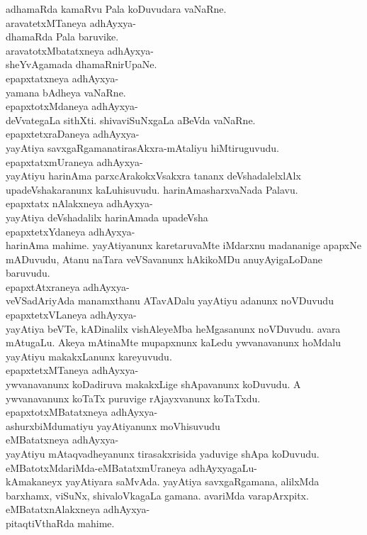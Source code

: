 \documentclass{article}
\begin{document}
adhamaRda kamaRvu Pala koDuvudara vaNaRne.\\
aravatetxMTaneya adhAyxya-\\
dhamaRda Pala baruvike.\\
aravatotxMbatatxneya adhAyxya-\\
sheYvAgamada dhamaRnirUpaNe.\\
epapxtatxneya adhAyxya-\\
yamana bAdheya vaNaRne.\\
epapxtotxMdaneya adhAyxya-\\
deVvategaLa sithXti. shivaviSuNxgaLa aBeVda vaNaRne.\\
epapxtetxraDaneya adhAyxya-\\
yayAtiya savxgaRgamanatirasAkxra-mAtaliyu hiMtiruguvudu.\\
epapxtatxmUraneya adhAyxya-\\
yayAtiyu harinAma parxcArakokxVsakxra tananx deVshadalelxlAlx upadeVshakaranunx kaLuhisuvudu. harinAmasharxvaNada Palavu.\\
epapxtatx nAlakxneya adhAyxya-\\
yayAtiya deVshadalilx harinAmada upadeVsha\\
epapxtetxYdaneya adhAyxya-\\
harinAma mahime. yayAtiyanunx karetaruvaMte iMdarxnu madananige apapxNe mADuvudu, Atanu naTara veVSavanunx hAkikoMDu anuyAyigaLoDane baruvudu.\\
epapxtAtxraneya adhAyxya-\\
veVSadAriyAda manamxthanu ATavADalu yayAtiyu adanunx noVDuvudu\\
epapxtetxVLaneya adhAyxya-\\
yayAtiya beVTe, kADinalilx vishAleyeMba heMgasanunx noVDuvudu. avara mAtugaLu. Akeya mAtinaMte mupapxnunx kaLedu ywvanavanunx hoMdalu yayAtiyu makakxLanunx kareyuvudu.\\
epapxtetxMTaneya adhAyxya-\\
ywvanavanunx koDadiruva makakxLige shApavanunx koDuvudu. A ywvanavanunx koTaTx puruvige rAjayxvanunx koTaTxdu.\\
epapxtotxMBatatxneya adhAyxya-\\
ashurxbiMdumatiyu yayAtiyanunx moVhisuvudu\\
eMBatatxneya adhAyxya-\\
yayAtiyu mAtaqvadheyanunx tirasakxrisida yaduvige shApa koDuvudu.\\
eMBatotxMdariMda-eMBatatxmUraneya adhAyxyagaLu-\\
kAmakaneyx yayAtiyara saMvAda. yayAtiya savxgaRgamana, alilxMda barxhamx, viSuNx, shivaloVkagaLa gamana. avariMda varapArxpitx.\\
eMBatatxnAlakxneya adhAyxya-\\
pitaqtiVthaRda mahime.\\
\end{document}
